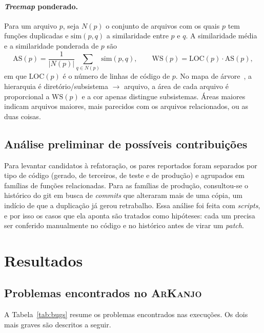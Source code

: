 \documentclass{article}
\newcommand{\scene}[2]{\todo[size=\tiny,color=blue!10]{#1 (#2)}}
\newcommand{\ark}{\textsc{ArKanjo}}
\begin{document}
\paragraph{\textit{Treemap} ponderado.} Para um arquivo $p$, seja $N(p)$ o conjunto de arquivos com os quais $p$ tem funções duplicadas e $\mathrm{sim}(p,q)$ a similaridade entre $p$ e $q$. A similaridade média e a similaridade ponderada de $p$ são
\begin{equation}
  \mathrm{AS}(p) = \frac{1}{|N(p)|}\sum_{q \in N(p)} \mathrm{sim}(p,q),
  \qquad
  \mathrm{WS}(p) = \mathrm{LOC}(p)\cdot \mathrm{AS}(p),
\end{equation}
em que $\mathrm{LOC}(p)$ é o número de linhas de código de $p$. No mapa de árvore~\cite{shneiderman1992treemap}, a hierarquia é diretório/subsistema $\rightarrow$ arquivo, a área de cada arquivo é proporcional a $\mathrm{WS}(p)$ e a cor apenas distingue subsistemas. Áreas maiores indicam arquivos maiores, mais parecidos com os arquivos relacionados, ou as duas coisas.

\subsection{Análise preliminar de possíveis contribuições}
\label{sec:triagem}

Para levantar candidatos à refatoração, os pares reportados foram separados por tipo de código (gerado, de terceiros, de teste e de produção) e agrupados em famílias de funções relacionadas. Para as famílias de produção, consultou-se o histórico do git em busca de \textit{commits} que alteraram mais de uma cópia, um indício de que a duplicação já gerou retrabalho. Essa análise foi feita com \textit{scripts}, e por isso os casos que ela aponta são tratados como hipóteses: cada um precisa ser conferido manualmente no código e no histórico antes de virar um \emph{patch}.

\section{Resultados}\label{sec:resultados}

\subsection{Problemas encontrados no \ark}

\scene{Scene 4a}{4:00--4:50}

A Tabela~\ref{tab:bugs} resume os problemas encontrados nas execuções. Os dois mais graves são descritos a seguir.
\end{document}
